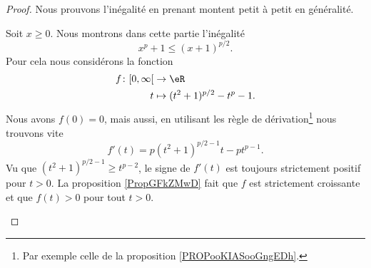 \begin{proof}
    Nous prouvons l'inégalité en prenant montent petit à petit en généralité.
    \begin{subproof}
        \spitem[Avec \( x>0\)]
        Soit \( x\geq 0\). Nous montrons dans cette partie l'inégalité
        \begin{equation}        \label{EQooDJBNooEyfNtq}
            x^p+1\leq (x+1)^{p/2}.
        \end{equation}
        Pour cela nous considérons la fonction
        \begin{equation}
            \begin{aligned}
                f\colon \mathopen[ 0 , \infty \mathclose[ & \to \eR                      \\
                t                                         & \mapsto (t^2+1)^{p/2}-t^p-1.
            \end{aligned}
        \end{equation}
        Nous avons \( f(0)=0\), mais aussi, en utilisant les règle de dérivation\footnote{Par exemple celle de la proposition \ref{PROPooKIASooGngEDh}.} nous trouvons vite
        \begin{equation}
            f'(t)=p(t^2+1)^{p/2-1}t-pt^{p-1}.
        \end{equation}
        Vu que \( (t^2+1)^{p/2-1}\geq t^{p-2}\), le signe de \( f'(t)\) est toujours strictement positif pour \( t>0\). La proposition \ref{PropGFkZMwD} fait que \( f\) est strictement croissante et que \( f(t)>0\) pour tout \( t>0\).


\end{subproof}
\end{proof}
